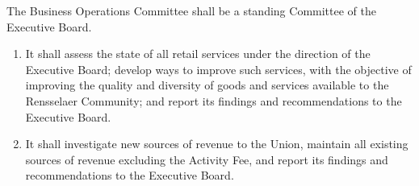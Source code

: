 \item The Business Operations Committee shall be a standing Committee of the Executive Board.

\begin{enumerate}

\item It shall assess the state of all retail services under the direction of the Executive Board; develop ways to improve such services, with the objective of improving the quality and diversity of goods and services available to the Rensselaer Community; and report its findings and recommendations to the Executive Board.

\item It shall investigate new sources of revenue to the Union, maintain all existing sources of revenue excluding the Activity Fee, and report its findings and recommendations to the Executive Board.

\end{enumerate}